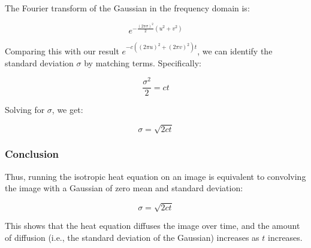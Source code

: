\documentclass{article}
\begin{document}
The Fourier transform of the Gaussian in the frequency domain is:

\[
e^{-\frac{(2\pi\sigma)^2}{2} \left( u^2 + v^2 \right)}
\]

Comparing this with our result \( e^{-c \left( (2 \pi u)^2 + (2 \pi v)^2 \right) t} \), we can identify the standard deviation \( \sigma \) by matching terms. Specifically:

\[
\frac{\sigma^2}{2} = c t
\]

Solving for \( \sigma \), we get:

\[
\sigma = \sqrt{2 c t}
\]

\subsubsection*{Conclusion}

Thus, running the isotropic heat equation on an image is equivalent to convolving the image with a Gaussian of zero mean and standard deviation:

\[
\sigma = \sqrt{2 c t}
\]

This shows that the heat equation diffuses the image over time, and the amount of diffusion (i.e., the standard deviation of the Gaussian) increases as \( t \) increases.
\end{document}
